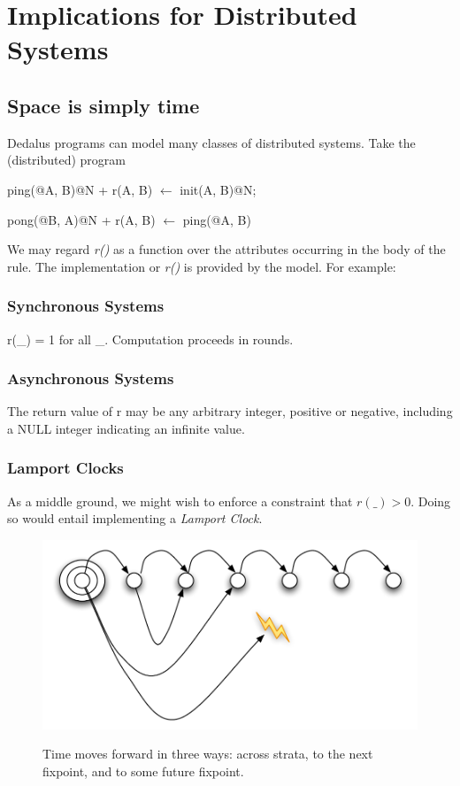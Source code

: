 \section{Implications for Distributed Systems}

\subsection{Space is simply time}

Dedalus programs can model many classes of distributed systems.  Take the (distributed) program

\begin{Dedalus}
ping(@A, B)@N + r(A, B) \(\leftarrow\)
  init(A, B)@N; 

pong(@B, A)@N + r(A, B) \(\leftarrow\)
  ping(@A, B)
\end{Dedalus}

We may regard  \emph{r()} as a function over the attributes occurring in the body of the rule.   The implementation or \emph{r()} is provided by
the model.  For example:

\subsubsection{Synchronous Systems}

r(\_) = 1 for all \_.  Computation proceeds in rounds.

\subsubsection{Asynchronous Systems}

The return value of r may be any arbitrary integer, positive or negative, including a NULL integer indicating an infinite value.

\subsubsection{Lamport Clocks}

As a middle ground, we might wish to enforce a constraint that $r(\_) > 0$.  Doing so would entail implementing a \emph{Lamport Clock}. 

\begin{figure}[t]
  \centering
  \includegraphics[width=0.75\linewidth]{dedalus-time.pdf}
  \label{fig:dedalus-time}
  \caption{Time moves forward in three ways: across strata, to the next fixpoint, and to some future fixpoint.}
\vspace{-8pt}
\end{figure}



